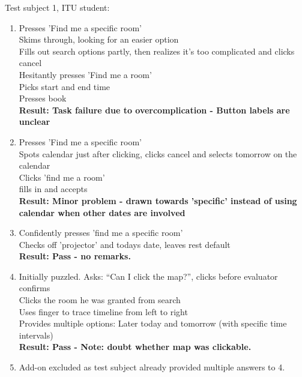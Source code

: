 Test subject 1, ITU student:
\begin{enumerate}
\item Presses 'Find me a specific room'\\
Skims through, looking for an easier option \\
Fills out search options partly, then realizes it's too complicated and clicks cancel \\
Hesitantly presses 'Find me a room' \\
Picks start and end time \\
Presses book\\
\textbf{Result: Task failure due to overcomplication - Button labels are unclear}
\item Presses 'Find me a specific room' \\
Spots calendar just after clicking, clicks cancel and selects tomorrow on the calendar \\
Clicks 'find me a room' \\
fills in and accepts \\
\textbf{Result: Minor problem - drawn towards 'specific' instead of using calendar when other dates are involved}
\item Confidently presses 'find me a specific room' \\
Checks off 'projector' and todays date, leaves rest default \\
\textbf{Result: Pass - no remarks.}
\item Initially puzzled. Asks: ``Can I click the map?'', clicks before evaluator confirms \\
Clicks the room he was granted from search \\
Uses finger to trace timeline from left to right \\
Provides multiple options: Later today and tomorrow (with specific time intervals) \\
\textbf{Result: Pass - Note: doubt whether map was clickable. }
\item Add-on excluded as test subject already provided multiple answers to 4.
\end{enumerate}

